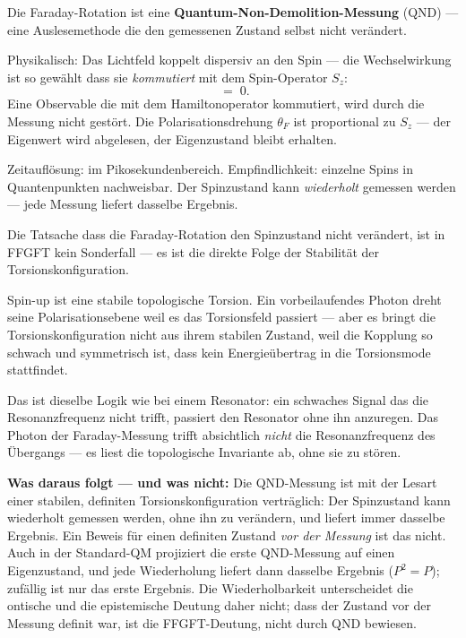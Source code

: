 \begin{keyresult}
Die Faraday-Rotation ist eine
\textbf{Quantum-Non-Demolition-Messung} (QND) ---
eine Auslesemethode die den gemessenen Zustand
selbst nicht verändert.

Physikalisch: Das Lichtfeld koppelt dispersiv an den Spin ---
die Wechselwirkung ist so gewählt dass sie \emph{kommutiert}
mit dem Spin-Operator $S_z$:
\begin{equation}
  [H_\text{Faraday},\; S_z] \;=\; 0.
\end{equation}
Eine Observable die mit dem Hamiltonoperator kommutiert,
wird durch die Messung nicht gestört.
Die Polarisationsdrehung $\theta_F$ ist proportional zu $S_z$
--- der Eigenwert wird abgelesen, der Eigenzustand bleibt erhalten.

Zeitauflösung: im Pikosekundenbereich.
Empfindlichkeit: einzelne Spins in Quantenpunkten nachweisbar.
Der Spinzustand kann \emph{wiederholt} gemessen werden ---
jede Messung liefert dasselbe Ergebnis.
\end{keyresult}

\begin{foundation}
Die Tatsache dass die Faraday-Rotation den Spinzustand
nicht verändert, ist in FFGFT kein Sonderfall ---
es ist die direkte Folge der Stabilität der Torsionskonfiguration.

Spin-up ist eine stabile topologische Torsion.
Ein vorbeilaufendes Photon dreht seine Polarisationsebene
weil es das Torsionsfeld passiert --- aber es bringt
die Torsionskonfiguration nicht aus ihrem stabilen Zustand,
weil die Kopplung so schwach und symmetrisch ist,
dass kein Energieübertrag in die Torsionsmode stattfindet.

Das ist dieselbe Logik wie bei einem Resonator:
ein schwaches Signal das die Resonanzfrequenz nicht trifft,
passiert den Resonator ohne ihn anzuregen.
Das Photon der Faraday-Messung trifft absichtlich
\emph{nicht} die Resonanzfrequenz des Übergangs ---
es liest die topologische Invariante ab, ohne sie zu stören.

\textbf{Was daraus folgt --- und was nicht:}
Die QND-Messung ist mit der Lesart einer stabilen, definiten
Torsionskonfiguration verträglich: Der Spinzustand kann wiederholt
gemessen werden, ohne ihn zu verändern, und liefert immer dasselbe
Ergebnis. Ein Beweis für einen definiten Zustand \emph{vor der Messung}
ist das nicht. Auch in der Standard-QM projiziert die erste
QND-Messung auf einen Eigenzustand, und jede Wiederholung liefert
dann dasselbe Ergebnis ($P^2 = P$); zufällig ist nur das erste
Ergebnis. Die Wiederholbarkeit unterscheidet die ontische und die
epistemische Deutung daher nicht; dass der Zustand vor der Messung
definit war, ist die FFGFT-Deutung, nicht durch QND bewiesen.
\end{foundation}

